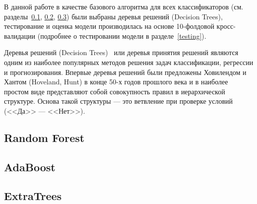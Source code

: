 В данной работе в качестве базового алгоритма для всех классификаторов (см. разделы~\ref{random_forest},
\ref{ada}, \ref{extra}) были выбраны деревья решений 
(Decision Trees), тестирование и оценка модели производилась на основе 10-фолдовой кросс-валидации (подробнее
о тестировании модели в разделе~\ref{testing}).

Деревья решений (Decision Trees)~\cite{data_mining} или деревья принятия решений являются одним из наиболее популярных
методов решения задач классификации, регрессии и прогнозирования. Впервые деревья решений были предложены Ховилендом и Хантом (Hoveland, Hunt) 
в конце 50-х годов прошлого века и в наиболее простом виде представляют собой совокупность правил в иерархической 
структуре. Основа такой структуры --- это ветвление при проверке условий (<<Да>> --- <<Нет>>). 



\subsection{Random Forest}\label{random_forest}

 

\subsection{AdaBoost}\label{ada}


\subsection{ExtraTrees}\label{extra}
